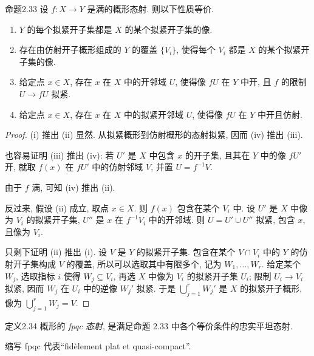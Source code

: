 \begin{origstatement}{命题}{2.33}\label{ch02:prop233}
设 $f:X\to Y$ 是满的概形态射. 则以下性质等价.
\begin{enumerate}
\item[(i)] $Y$ 的每个拟紧开子集都是 $X$ 的某个拟紧开子集的像.
\item[(ii)] 存在由仿射开子概形组成的 $Y$ 的覆盖 $\{V_i\}$, 使得每个 $V_i$ 都是 $X$ 的某个拟紧开子集的像.
\item[(iii)] 给定点 $x\in X$, 存在 $x$ 在 $X$ 中的开邻域 $U$, 使得像 $fU$ 在 $Y$ 中开, 且 $f$ 的限制 $U\to fU$ 拟紧.
\item[(iv)] 给定点 $x\in X$, 存在 $x$ 在 $X$ 中的拟紧开邻域 $U$, 使得像 $fU$ 在 $Y$ 中开且仿射.
\end{enumerate}
\end{origstatement}
\begin{proof}
(i) 推出 (ii) 显然. 从拟紧概形到仿射概形的态射拟紧, 因而 (iv) 推出 (iii).

也容易证明 (iii) 推出 (iv): 若 $U'$ 是 $X$ 中包含 $x$ 的开子集, 且其在 $Y$ 中的像 $fU'$ 开, 就取 $f(x)$ 在 $fU'$ 中的仿射邻域 $V$, 并置 $U=f^{-1}V$.

由于 $f$ 满, 可知 (iv) 推出 (ii).

反过来, 假设 (ii) 成立, 取点 $x\in X$. 则 $f(x)$ 包含在某个 $V_i$ 中. 设 $U'$ 是 $X$ 中像为 $V_i$ 的拟紧开子集, $U''$ 是 $x$ 在 $f^{-1}V_i$ 中的开邻域. 则 $U=U'\cup U''$ 拟紧, 包含 $x$, 且像为 $V_i$.

只剩下证明 (ii) 推出 (i). 设 $V$ 是 $Y$ 的拟紧开子集. 包含在某个 $V\cap V_i$ 中的 $Y$ 的仿射开子集构成 $V$ 的覆盖, 所以可以选取其中有限多个, 记为 $W_1,\ldots,W_r$. 给定某个 $W_j$, 选取指标 $i$ 使得 $W_j\subseteq V_i$, 再选 $X$ 中像为 $V_i$ 的拟紧开子集 $U_i$; 限制 $U_i\to V_i$ 拟紧, 因而 $W_j$ 在 $U_i$ 中的逆像 $W_j'$ 拟紧. 于是 $\bigcup_{j=1}^rW_j'$ 是 $X$ 的拟紧开子概形, 像为 $\bigcup_{j=1}^rW_j=V$.
\end{proof}

\begin{origstatement}{定义}{2.34}\label{ch02:def234}
概形的 \emph{fpqc 态射}, 是满足命题 2.33 中各个等价条件的忠实平坦态射.
\end{origstatement}

缩写 fpqc 代表“fidèlement plat et quasi-compact”.

